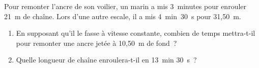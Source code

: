 \begin{exercice}
Pour remonter l'ancre de son voilier, un marin a mis 3 minutes pour enrouler 21 m de chaîne. Lors d’une autre escale, il a mis 4 min 30 s pour 31,50 m.
\begin{enumerate}
 \item En supposant qu'il le fasse à vitesse constante, combien de temps mettra-t-il pour remonter une ancre jetée à 10,50 m de fond ?
 \item Quelle longueur de chaîne enroulera-t-il en 13 min 30 s ?
 \end{enumerate}
\end{exercice}


